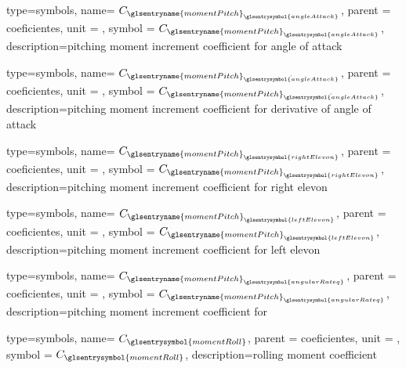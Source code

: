 {type=symbols,
    name= \ensuremath{C_{{\glsentryname{momentPitch}}_{\glsentrysymbol{angleAttack}}}},
    parent = {coeficientes},
    unit = \unexpanded{},
    symbol = \ensuremath{C_{{\glsentryname{momentPitch}}_{\glsentrysymbol{angleAttack}}}},
    description={pitching moment increment coefficient for angle of attack}
}

{type=symbols,
    name= \ensuremath{C_{{\glsentryname{momentPitch}}_{\dot{\glsentrysymbol{angleAttack}}}}},
    parent = {coeficientes},
    unit = \unexpanded{},
    symbol = \ensuremath{C_{{\glsentryname{momentPitch}}_{\dot{\glsentrysymbol{angleAttack}}}}},
    description={pitching moment increment coefficient for derivative of angle of attack}
}

{type=symbols,
    name= \ensuremath{C_{{\glsentryname{momentPitch}}_{\glsentrysymbol{rightElevon}}}},
    parent = {coeficientes},
    unit = \unexpanded{},
    symbol = \ensuremath{C_{{\glsentryname{momentPitch}}_{\glsentrysymbol{rightElevon}}}},
    description={pitching moment increment coefficient for right elevon }
}

{type=symbols,
    name= \ensuremath{C_{{\glsentryname{momentPitch}}_{\glsentrysymbol{leftElevon}}}},
    parent = {coeficientes},
    unit = \unexpanded{},
    symbol = \ensuremath{C_{{\glsentryname{momentPitch}}_{\glsentrysymbol{leftElevon}}}},
    description={pitching moment increment coefficient for left elevon }
}


{type=symbols,
    name= \ensuremath{C_{{\glsentryname{momentPitch}}_{\glsentrysymbol{angularRateq}}}},
    parent = {coeficientes},
    unit = \unexpanded{},
    symbol = \ensuremath{C_{{\glsentryname{momentPitch}}_{\glsentrysymbol{angularRateq}}}},
    description={pitching moment increment coefficient for }
}

{type=symbols,
    name= \ensuremath{C_{\glsentrysymbol{momentRoll}}},
    parent = {coeficientes},
    unit = \unexpanded{},
    symbol = \ensuremath{C_{\glsentrysymbol{momentRoll}}},
    description={rolling moment coefficient}
}

